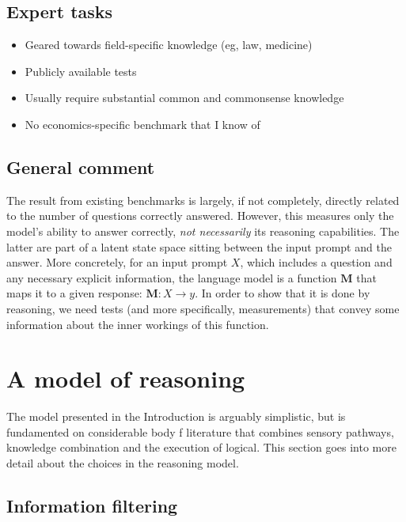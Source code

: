 \documentclass[
]{article}
\providecommand{\tightlist}{%
  \setlength{\itemsep}{0pt}\setlength{\parskip}{0pt}}\usepackage{longtable,booktabs,array}
\begin{document}
\subsection{Expert tasks}\label{expert-tasks}

\begin{itemize}
\tightlist
\item
  Geared towards field-specific knowledge (eg, law, medicine)
\item
  Publicly available tests
\item
  Usually require substantial common and commonsense knowledge
\item
  No economics-specific benchmark that I know of
\end{itemize}

\subsection{General comment}\label{general-comment}

The result from existing benchmarks is largely, if not completely,
directly related to the number of questions correctly answered. However,
this measures only the model's ability to answer correctly, \emph{not
necessarily} its reasoning capabilities. The latter are part of a latent
state space sitting between the input prompt and the answer. More
concretely, for an input prompt \(X\), which includes a question and any
necessary explicit information, the language model is a function
\(\mathbf{M}\) that maps it to a given response:
\(\mathbf{M} : X \to y\). In order to show that it is done by reasoning,
we need tests (and more specifically, measurements) that convey some
information about the inner workings of this function.

\section{A model of reasoning}\label{a-model-of-reasoning}

The model presented in the Introduction is arguably simplistic, but is
fundamented on considerable body f literature that combines sensory
pathways, knowledge combination and the execution of logical. This
section goes into more detail about the choices in the reasoning model.

\subsection{Information filtering}\label{information-filtering}
\end{document}
